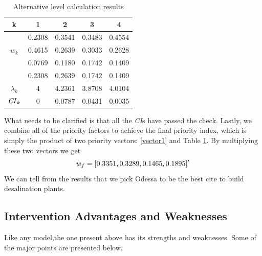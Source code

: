 \begin{table}[!htbp]
\centering\caption{Alternative level calculation results}
\begin{tabular}{c|cccc}
  \hline
  k & 1 & 2 & 3 & 4  \\
  \hline
  & 0.2308 & 0.3541 & 0.3483 & 0.4554  \\
  $w_k$ & 0.4615 & 0.2639 & 0.3033 & 0.2628  \\
   & 0.0769 & 0.1180 & 0.1742 & 0.1409  \\
   & 0.2308 & 0.2639 & 0.1742 & 0.1409  \\
  \hline
  $\lambda_k$ & 4 & 4.2361 & 3.8708 & 4.0104  \\
  \hline
  $\mbox{\textit{CI}}_k$ &0&0.0787&0.0431&0.0035 \\
  \hline
\end{tabular}\label{vector2}
\end{table}

What needs to be clarified is that all the \textit{CI}s have passed the check.
Lastly, we combine all of the priority factors to achieve the final priority index, which is simply the product of two priority vectors: \eqref{vector1} and Table \ref{vector2}. By multiplying these two vectors we get
\begin{equation}
\mbox{\textbf{$w_f$}}=[0.3351,0.3289,0.1465,0.1895]^\prime
\end{equation}
We can tell from the results that we pick Odessa to be the best cite to build desalination plants.

\subsection{Intervention Advantages and Weaknesses}
Like any model,the one present above has its strengths and weaknesses. Some of the major points are presented below.
